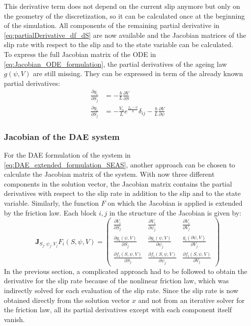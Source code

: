 This derivative term does not depend on the current slip anymore but only on the geometry of the discretization, so it can be calculated once at the beginning of the simulation. All components of the remaining partial derivative in \autoref{eq:partialDerivative_df_dS} are now available and the Jacobian matrices of the slip rate with respect to the slip and to the state variable can be calculated. \\
To express the full Jacobian matrix of the ODE in \autoref{eq:Jacobian_ODE_formulation}, the partial derivatives of the ageing law $g(\psi, V)$ are still missing. They can be expressed in term of the already known partial derivatives: 
\begin{align}
	\frac{\partial g_i}{\partial S_j} &= -\frac{b}{L}\frac{\partial V}{\partial S} \\
	\frac{\partial g_i}{\partial S_j} &= -\frac{V_0}{L}e^{\frac{f_0 - \psi}{b}}\delta_{ij} -
										  \frac{b}{L}\frac{\partial V}{\partial \psi}
\end{align}



\subsubsection{Jacobian of the DAE system}
\label{sssec:Jacobian_DAE}
For the DAE formulation of the system in \autoref{eq:DAE_extended_formulation_SEAS}, another approach can be chosen to calculate the Jacobian matrix of the system. With now three different components in the solution vector, the Jacobian matrix contains the partial derivatives with respect to the slip rate in addition to the slip and to the state variable. Similarly, the function $F$ on which the Jacobian is applied is extended by the friction law. Each block $i,j$ in the structure of the Jacobian is given by:
\begin{equation}
	\label{eq:Jacobian_DAE_formulation}
	\mathbf{J}_{S_j,\psi_j,V_j}F_i(S,\psi,V) = 	\begin{pmatrix}
											\frac{\partial V_i}{\partial S_j} & \frac{\partial V_i}{\partial \psi_j} & \frac{\partial V_i}{\partial V_j} \\
											\frac{\partial g_i(\psi,V)}{\partial S_j} & \frac{\partial g_i(\psi,V)}{\partial \psi_j} & \frac{g_i(\partial \psi,V)}{\partial V_j} \\
											\frac{\partial f_i(S,\psi,V)}{\partial S_j} & \frac{\partial f_i(S,\psi,V)}{\partial \psi_j} & \frac{\partial f_i(S,\psi,V)}{\partial V_j}
										\end{pmatrix}
\end{equation}
In the previous section, a complicated approach had to be followed to obtain the derivative for the slip rate because of the nonlinear friction law, which was indirectly solved for each evaluation of the slip rate. Since the slip rate is now obtained directly from the solution vector $x$ and not from an iterative solver for the friction law, all its partial derivatives except with each component itself vanish. 

